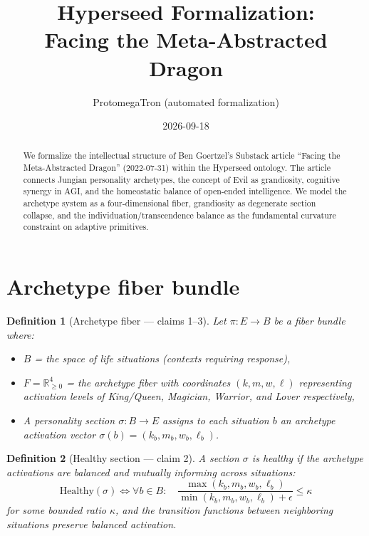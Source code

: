 \documentclass[11pt,a4paper]{article}
\title{Hyperseed Formalization:\\
  Facing the Meta-Abstracted Dragon}
\author{ProtomegaTron (automated formalization)}
\date{2026-09-18}
\newtheorem{definition}{Definition}[section]
\begin{document}
\maketitle

\begin{abstract}
We formalize the intellectual structure of Ben Goertzel's Substack article
``Facing the Meta-Abstracted Dragon'' (2022-07-31) within the Hyperseed
ontology. The article connects Jungian personality archetypes, the concept
of Evil as grandiosity, cognitive synergy in AGI, and the homeostatic
balance of open-ended intelligence. We model the archetype system as a
four-dimensional fiber, grandiosity as degenerate section collapse, and the
individuation/transcendence balance as the fundamental curvature constraint
on adaptive primitives.
\end{abstract}

\tableofcontents

\section{Archetype fiber bundle}
\label{sec:archetype-bundle}

\begin{definition}[Archetype fiber --- claims 1--3]
\label{def:archetype-fiber}
Let $\pi : E \to B$ be a fiber bundle where:
\begin{itemize}
\item $B$ = the space of life situations (contexts requiring response),
\item $F = \mathbb{R}^4_{\geq 0}$ = the archetype fiber with coordinates
  $(k, m, w, \ell)$ representing activation levels of
  King/Queen, Magician, Warrior, and Lover respectively,
\item A \emph{personality section} $\sigma : B \to E$ assigns to each
  situation $b$ an archetype activation vector $\sigma(b) = (k_b, m_b, w_b, \ell_b)$.
\end{itemize}
\end{definition}

\begin{definition}[Healthy section --- claim 2]
\label{def:healthy}
A section $\sigma$ is \emph{healthy} if the archetype activations are
balanced and mutually informing across situations:
\[
  \text{Healthy}(\sigma) \iff
  \forall b \in B: \quad
  \frac{\max(k_b, m_b, w_b, \ell_b)}{\min(k_b, m_b, w_b, \ell_b) + \epsilon}
  \leq \kappa
\]
for some bounded ratio $\kappa$, and the transition functions between
neighboring situations preserve balanced activation.
\end{definition}
\end{document}
